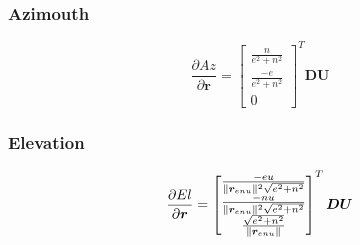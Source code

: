 \subsubsection{Azimouth}
\label{sssec:azimouth}
\begin{equation}
  \label{eq:mont798}
  \frac{\partial Az}{\partial \bm{r}} = \begin{bmatrix} 
      \frac{n}{e^2 + n^2} \\
      \frac{-e}{e^2 + n^2} \\
      0 \end{bmatrix}^T
    \bm{D} \bm{U}
\end{equation}

\subsubsection{Elevation}
\label{sssec:elevation}
\begin{equation}
  \label{eq:mont799}
  \frac{\partial El}{\partial \bm{r}} = 
    \begin{bmatrix} 
        \frac{-e u}{ \lVert\bm{r}_{enu}\rVert ^2 \sqrt{e^2 + n^2}} \\
        \frac{-n u}{ \lVert\bm{r}_{enu}\rVert ^2 \sqrt{e^2 + n^2}} \\
        \frac{\sqrt{e^2 + n^2}}{\lVert\bm{r}_{enu}\rVert} 
      \end{bmatrix}^T
    \bm{D} \bm{U}
\end{equation}
